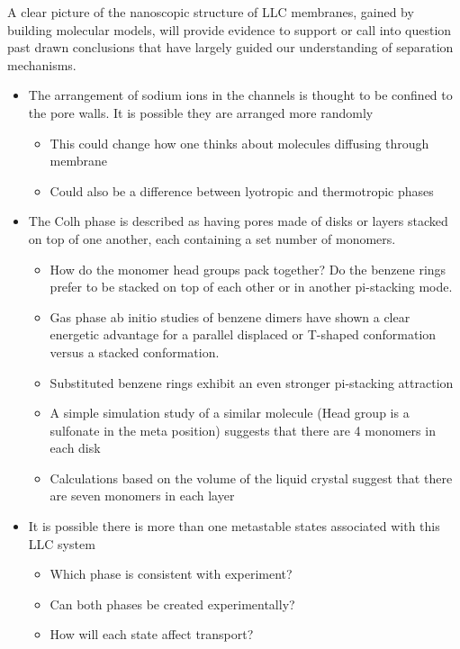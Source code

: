 \documentclass{article}
\begin{document}
	A clear picture of the nanoscopic structure of LLC membranes, gained by building 
molecular models, will provide evidence to support or call into question past drawn conclusions that have largely guided our understanding of separation mechanisms. 
	\begin{itemize}
 		\item The arrangement of sodium ions in the channels is thought to be confined to the pore walls. It is possible they are arranged more randomly
		\begin{itemize}
			\item This could change how one thinks about molecules diffusing through membrane
			\item Could also be a difference between lyotropic and thermotropic phases
		\end{itemize}
		\item The Colh phase is described as having pores made of disks or layers stacked on top of one another, each containing a set number of monomers. 
		\begin{itemize}
			\item How do the monomer head groups pack together? Do the benzene rings prefer to be stacked on top of each other or in another pi-stacking mode.
			\item Gas phase ab initio studies of benzene dimers have shown a clear energetic advantage for a parallel displaced or T-shaped conformation versus a stacked conformation. 
			\item Substituted benzene rings exhibit an even stronger pi-stacking attraction %
			\item A simple simulation study of a similar molecule (Head group is a sulfonate in the meta position) suggests that there are 4 monomers in each disk
			\item Calculations based on the volume of the liquid crystal suggest that there are seven monomers in each layer %
		\end{itemize}
		\item It is possible there is more than one metastable states associated with this LLC system
		\begin{itemize}
			\item Which phase is consistent with experiment?
			\item Can both phases be created experimentally?
			\item How will each state affect transport?
		\end{itemize}
	\end{itemize}
	
\end{document}
